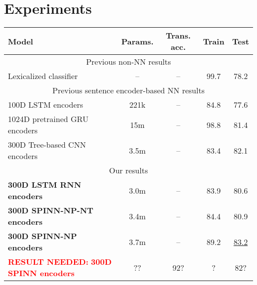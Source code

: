 \documentclass[11pt]{article}
\newcommand\result[1]{\textcolor{red}{\textbf{RESULT NEEDED:} #1}}
\begin{document}
\section{Experiments}

\begin{table*}[t]
  \centering\small
  \begin{tabular}{lcccc} 
    \toprule
Model                   & Params.    & Trans. acc.  &   Train  &   Test \\
\midrule
\multicolumn{5}{c}{Previous non-NN results}\\
\midrule
Lexicalized classifier \citep{snli:emnlp2015}
                        & --                & --                    &   99.7   &   78.2      \\
\midrule
\multicolumn{5}{c}{Previous sentence encoder-based NN results}\\
\midrule
100D LSTM encoders \citep{snli:emnlp2015}
                        & 221k               & --               &   84.8   &   77.6      \\
1024D pretrained GRU encoders \citep{DBLP:journals/corr/VendrovKFU15}
                        & 15m                & --              &   98.8   &   81.4       \\
300D Tree-based CNN encoders \citep{mou2015recognizing}
                        & 3.5m                & --             &   83.4   &   82.1       \\
\midrule
\multicolumn{5}{c}{Our results}\\
\midrule
\textbf{300D LSTM RNN encoders}          & 3.0m                  & --                &   83.9      &   80.6       \\
\textbf{300D SPINN-NP-NT encoders}
                        & 3.4m                  & --                &   84.4      &   80.9       \\
\textbf{300D SPINN-NP encoders}
                        & 3.7m                  & --                &   89.2      &   \underline{83.2}       \\
\result{\textbf{300D SPINN encoders} }
                        & ??                  & 92?           &   ?    &   82?      \\          

\end{tabular}
\end{table*}
\end{document}
